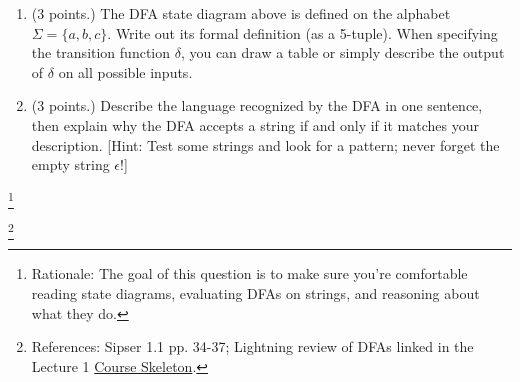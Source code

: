 \documentclass[letterpaper,11pt,twoside]{article}
\theoremstyle{plain}
\theoremstyle{definition}
\theoremstyle{remark}
\theoremstyle{restate}
\newcommand\blfootnote[1]{%
  \begingroup
  \renewcommand\thefootnote{}\footnote{#1}%
  \addtocounter{footnote}{-1}%
  \endgroup
}
\begin{document}
\begin{enumerate}
    \item (3 points.) The DFA state diagram above is defined on the alphabet $\Sigma = \{a,b,c\}$. Write out its formal definition (as a 5-tuple). When specifying the transition function $\delta$, you can draw a table or simply describe the output of $\delta$ on all possible inputs. 
    
    \item (3 points.) Describe the language recognized by the DFA in one sentence, then explain why the DFA accepts a string if and only if it matches your description. [Hint: Test some strings and look for a pattern; never forget the empty string $\epsilon$!]
    
    \end{enumerate}
    
\blfootnote{ Rationale: The goal of this question is to make sure you're comfortable reading state diagrams, evaluating DFAs on strings, and reasoning about what they do. }
\blfootnote{ References: Sipser 1.1 pp. 34-37; Lightning review of DFAs linked in the Lecture 1 \href{https://docs.google.com/document/d/1PHCNkMitYsMpbh-sxrBmr-cGbpUEshfdFDS2k09fHrI}{Course Skeleton}.}
    
\clearpage
\end{document}
